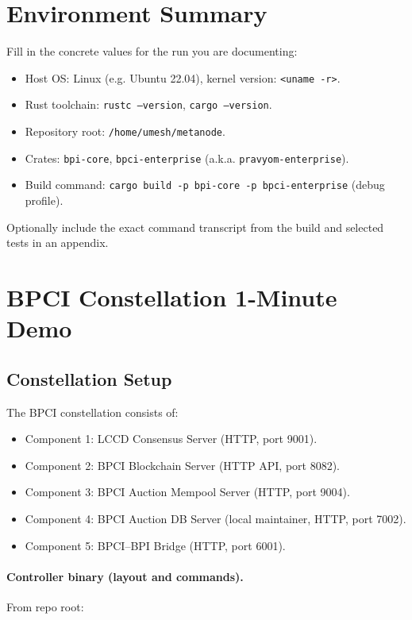 \section{Environment Summary}

Fill in the concrete values for the run you are documenting:

\begin{itemize}
  \item Host OS: Linux (e.g. Ubuntu 22.04), kernel version: \texttt{<uname -r>}.
  \item Rust toolchain: \texttt{rustc --version}, \texttt{cargo --version}.
  \item Repository root: \texttt{/home/umesh/metanode}.
  \item Crates: \texttt{bpi-core}, \texttt{bpci-enterprise} (a.k.a. \texttt{pravyom-enterprise}).
  \item Build command: \texttt{cargo build -p bpi-core -p bpci-enterprise} (debug profile).
\end{itemize}

Optionally include the exact command transcript from the build and selected tests in an appendix.

\section{BPCI Constellation 1-Minute Demo}

\subsection{Constellation Setup}

The BPCI constellation consists of:

\begin{itemize}
  \item Component 1: LCCD Consensus Server (HTTP, port 9001).
  \item Component 2: BPCI Blockchain Server (HTTP API, port 8082).
  \item Component 3: BPCI Auction Mempool Server (HTTP, port 9004).
  \item Component 4: BPCI Auction DB Server (local maintainer, HTTP, port 7002).
  \item Component 5: BPCI--BPI Bridge (HTTP, port 6001).
\end{itemize}

\paragraph{Controller binary (layout and commands).}
From repo root:

